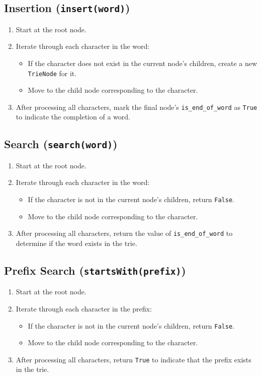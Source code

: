 \subsection*{Insertion (\texttt{insert(word)})}
\begin{enumerate}
    \item Start at the root node.
    \item Iterate through each character in the word:
    \begin{itemize}
        \item If the character does not exist in the current node's children, create a new \texttt{TrieNode} for it.
        \item Move to the child node corresponding to the character.
    \end{itemize}
    \item After processing all characters, mark the final node's \texttt{is\_end\_of\_word} as \texttt{True} to indicate the completion of a word.
\end{enumerate}

\subsection*{Search (\texttt{search(word)})}
\begin{enumerate}
    \item Start at the root node.
    \item Iterate through each character in the word:
    \begin{itemize}
        \item If the character is not in the current node's children, return \texttt{False}.
        \item Move to the child node corresponding to the character.
    \end{itemize}
    \item After processing all characters, return the value of \texttt{is\_end\_of\_word} to determine if the word exists in the trie.
\end{enumerate}

\subsection*{Prefix Search (\texttt{startsWith(prefix)})}
\begin{enumerate}
    \item Start at the root node.
    \item Iterate through each character in the prefix:
    \begin{itemize}
        \item If the character is not in the current node's children, return \texttt{False}.
        \item Move to the child node corresponding to the character.
    \end{itemize}
    \item After processing all characters, return \texttt{True} to indicate that the prefix exists in the trie.
\end{enumerate}


